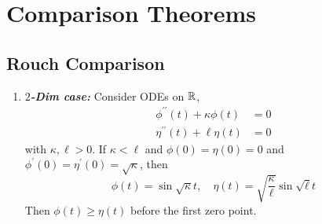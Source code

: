 \chapter{Comparison Theorems}

\section{Rouch Comparison}

\begin{enumerate}[label=\arabic{*}.]
		\item \emph{\textbf{$2$-Dim case:}} Consider ODEs on $\mathbb{R}$,
	\begin{equation*}
		\begin{aligned}
			\phi^{\prime\prime}(t) + \kappa \phi(t) &= 0 \\
			\eta^{\prime\prime}(t) + \ell \eta(t) &= 0
		\end{aligned}
	\end{equation*}
	with $\kappa,\ell > 0$. If $\kappa < \ell$ and $\phi(0) = \eta(0) = 0$ and $\phi^\prime(0) = \eta^\prime(0) = \sqrt{\kappa}$, then
	\begin{equation*}
		\phi(t) = \sin \sqrt{\kappa}t,\quad \eta(t) = \sqrt{\frac{\kappa}{\ell}}\sin \sqrt{\ell}t
	\end{equation*}
	Then $\phi(t) \geq \eta(t)$ before the first zero point.


\end{enumerate}
